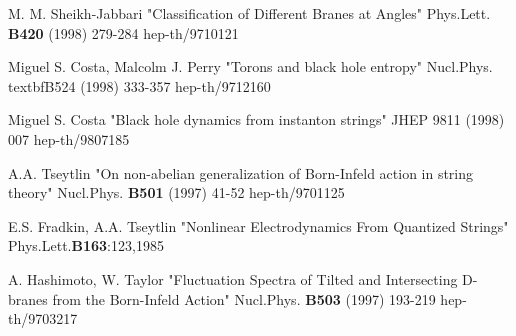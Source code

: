 \documentclass[a4paper,12pt]{article}
\begin{document}
\begin{thebibliography}{99}
M. M. Sheikh-Jabbari "Classification of Different Branes at Angles" Phys.Lett. \textbf{B420} (1998) 279-284 hep-th/9710121

Miguel S. Costa, Malcolm J. Perry "Torons and black hole entropy"  Nucl.Phys. textbf{B524} (1998) 333-357 hep-th/9712160

Miguel S. Costa "Black hole dynamics from instanton strings" JHEP 9811 (1998) 007 hep-th/9807185

 A.A. Tseytlin "On non-abelian generalization of Born-Infeld action in
string theory"  Nucl.Phys. \textbf{B501} (1997) 41-52 hep-th/9701125

E.S. Fradkin, A.A. Tseytlin "Nonlinear Electrodynamics From Quantized Strings"
 Phys.Lett.\textbf{B163}:123,1985 
 
A. Hashimoto, W. Taylor "Fluctuation Spectra of Tilted and Intersecting
D-branes from the Born-Infeld Action" Nucl.Phys. \textbf{B503} (1997) 193-219
hep-th/9703217 

\end{thebibliography} 
\end{document}
